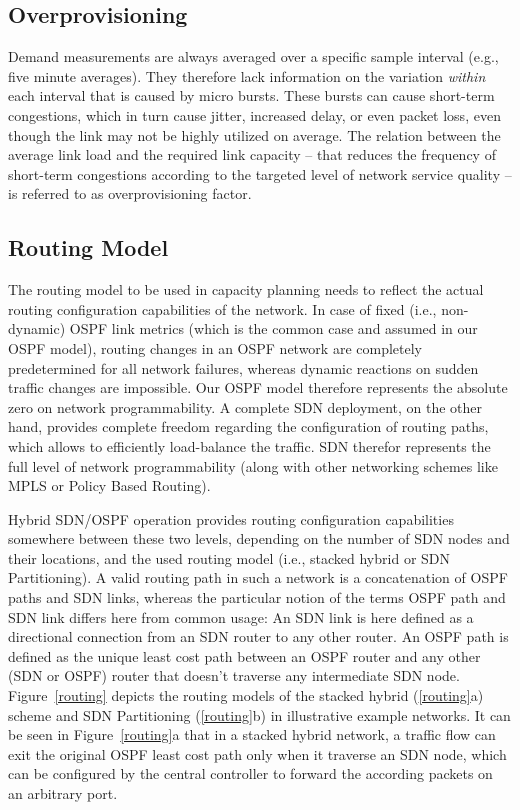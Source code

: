 \documentclass[10pt, conference]{IEEEtran}
\begin{document}
\subsection{Overprovisioning} Demand measurements are always averaged over a specific sample interval (e.g., five minute averages). They therefore lack information on the variation \emph{within} each interval that is caused by micro bursts. These bursts can cause short-term congestions, which in turn cause jitter, increased delay, or even packet loss, even though the link may not be highly utilized on average. The relation between the average link load and the required link capacity -- that reduces the frequency of short-term congestions according to the targeted level of network service quality -- is referred to as overprovisioning factor.


\subsection{Routing Model}
The routing model to be used in capacity planning needs to reflect the actual routing configuration capabilities of the network. In case of fixed (i.e., non-dynamic) OSPF link metrics (which is the common case and assumed in our OSPF model), routing changes in an OSPF network are completely predetermined for all network failures, whereas dynamic reactions on sudden traffic changes are impossible. Our OSPF model therefore represents the absolute zero on network programmability. A complete SDN deployment, on the other hand, provides complete freedom regarding the configuration of routing paths, which allows to efficiently load-balance the traffic. SDN therefor represents the full level of network programmability (along with other networking schemes like MPLS or Policy Based Routing).

Hybrid SDN/OSPF operation provides routing configuration capabilities somewhere between these two levels, depending on the number of SDN nodes and their locations, and the used routing model (i.e., stacked hybrid or SDN Partitioning). A valid routing path in such a network is a concatenation of OSPF paths and SDN links, whereas the particular notion of the terms OSPF path and SDN link differs here from common usage: An SDN link is here defined as a directional connection from an SDN router to any other router. An OSPF path is defined as the unique least cost path between an OSPF router and any other (SDN or OSPF) router that doesn't traverse any intermediate SDN node. Figure~\ref{routing} depicts the routing models of the stacked hybrid (\ref{routing}a) scheme and SDN Partitioning (\ref{routing}b) in illustrative example networks. It can be seen in Figure~\ref{routing}a that in a stacked hybrid network, a traffic flow can exit the original OSPF least cost path only when it traverse an SDN node, which can be configured by the central controller to forward the according packets on an arbitrary port.
\end{document}
